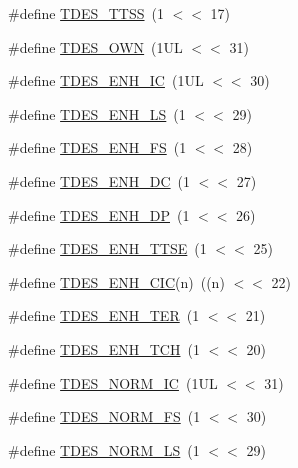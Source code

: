 \begin{DoxyCompactItemize}
\item 
\#define \hyperlink{group___e_n_e_t__18_x_x__43_x_x_ga6da869ea3e958cdef7c5e8e54386dc63}{T\+D\+E\+S\+\_\+\+T\+T\+SS}~(1 $<$$<$ 17)
\item 
\#define \hyperlink{group___e_n_e_t__18_x_x__43_x_x_ga16c27e1736ee5619800a4cf892aab519}{T\+D\+E\+S\+\_\+\+O\+WN}~(1\+U\+L $<$$<$ 31)
\item 
\#define \hyperlink{group___e_n_e_t__18_x_x__43_x_x_ga1fdd51dfc637ab04e6b28b6bb8616c34}{T\+D\+E\+S\+\_\+\+E\+N\+H\+\_\+\+IC}~(1\+U\+L $<$$<$ 30)
\item 
\#define \hyperlink{group___e_n_e_t__18_x_x__43_x_x_gac6f14aa28d0aaf870490f764365faed1}{T\+D\+E\+S\+\_\+\+E\+N\+H\+\_\+\+LS}~(1 $<$$<$ 29)
\item 
\#define \hyperlink{group___e_n_e_t__18_x_x__43_x_x_gad22d1a85908cc77388a8160bd9752ed0}{T\+D\+E\+S\+\_\+\+E\+N\+H\+\_\+\+FS}~(1 $<$$<$ 28)
\item 
\#define \hyperlink{group___e_n_e_t__18_x_x__43_x_x_ga9c2c768996190c92a8fff6f167e61d4c}{T\+D\+E\+S\+\_\+\+E\+N\+H\+\_\+\+DC}~(1 $<$$<$ 27)
\item 
\#define \hyperlink{group___e_n_e_t__18_x_x__43_x_x_gabfd3f803ecd157548b196f8f7672a4b1}{T\+D\+E\+S\+\_\+\+E\+N\+H\+\_\+\+DP}~(1 $<$$<$ 26)
\item 
\#define \hyperlink{group___e_n_e_t__18_x_x__43_x_x_ga13486ef5a5c85ec7d47f281ed540fced}{T\+D\+E\+S\+\_\+\+E\+N\+H\+\_\+\+T\+T\+SE}~(1 $<$$<$ 25)
\item 
\#define \hyperlink{group___e_n_e_t__18_x_x__43_x_x_ga15768856187b2625164eff6797a9498d}{T\+D\+E\+S\+\_\+\+E\+N\+H\+\_\+\+C\+IC}(n)~((n) $<$$<$ 22)
\item 
\#define \hyperlink{group___e_n_e_t__18_x_x__43_x_x_gaece750b7c9521e11e6afa36501d44fe1}{T\+D\+E\+S\+\_\+\+E\+N\+H\+\_\+\+T\+ER}~(1 $<$$<$ 21)
\item 
\#define \hyperlink{group___e_n_e_t__18_x_x__43_x_x_gae1cbc7314b4997599327cc3e8ed19b4c}{T\+D\+E\+S\+\_\+\+E\+N\+H\+\_\+\+T\+CH}~(1 $<$$<$ 20)
\item 
\#define \hyperlink{group___e_n_e_t__18_x_x__43_x_x_ga21496a89382ca356ff40d5f0e5fb62f9}{T\+D\+E\+S\+\_\+\+N\+O\+R\+M\+\_\+\+IC}~(1\+U\+L $<$$<$ 31)
\item 
\#define \hyperlink{group___e_n_e_t__18_x_x__43_x_x_ga346a00e467b947079124c0161a2fff46}{T\+D\+E\+S\+\_\+\+N\+O\+R\+M\+\_\+\+FS}~(1 $<$$<$ 30)
\item 
\#define \hyperlink{group___e_n_e_t__18_x_x__43_x_x_ga4ab2e194a9aabd4232d80ef074ba44aa}{T\+D\+E\+S\+\_\+\+N\+O\+R\+M\+\_\+\+LS}~(1 $<$$<$ 29)

\end{DoxyCompactItemize}
